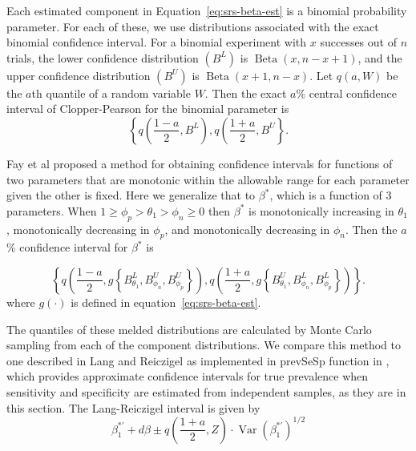 \documentclass[AMA,STIX1COL]{WileyNJD-v2}
\DeclareMathOperator{\Var}{Var}
\begin{document}
Each estimated component in Equation~\ref{eq:srs-beta-est} is a binomial probability parameter.
For each of these, we use distributions associated with  the exact binomial confidence interval.
For a binomial experiment with \( x \) successes out of \( n \) trials, the lower confidence distribution \( (B^L) \) is \( \operatorname{Beta}(x, n - x + 1) \), and the upper confidence distribution \( (B^U) \) is \( \operatorname{Beta}(x + 1, n - x)\).
Let \( q(a, W) \) be the \( a \)th quantile of a random variable \( W \). Then the exact \( a \)\% central confidence interval of Clopper-Pearson for the binomial parameter is 
\begin{equation}
\left\{ q \left( \frac{1-a}{2}, B^L \right), q \left( \frac{1+a}{2}, B^U \right\}.
\label{eq:C-P}
\end{equation}

Fay et al \cite{FayP:2015} proposed a method for obtaining confidence intervals for functions of two parameters that are monotonic within the allowable range  for each parameter given the other is fixed. Here we generalize that to $\beta^*$, which is a function of 3 parameters. When $1 \geq \phi_p > \theta_1 > \phi_n \geq 0$ then $\beta^*$ is monotonically increasing in $\theta_1$, monotonically decreasing in $\phi_p$, and monotonically decreasing in $\phi_n$.
Then the \( a \)\% confidence interval for \( \beta^* \) is 

\begin{equation}
    \left\{ q \left( \frac{1 - a}{2}, g \left\{ B_{\theta_1}^L, B_{\phi_n}^U, B_{\phi_p}^U \right\}   \right),  
            q \left( \frac{1 + a}{2},  g \left\{ B_{\theta_1}^U, B_{\phi_n}^L, B_{\phi_p}^L \right\}   \right) \right\}.
\label{eq:srs-conf-int}
\end{equation}
where $g(\cdot)$ is defined in equation~\ref{eq:srs-beta-est}.


The quantiles of these melded distributions are calculated by Monte Carlo sampling from each of the component distributions.
We compare this method to one described in Lang and Reiczigel \cite{Lang:2014} as implemented in prevSeSp function in \cite{asht}, which provides approximate confidence intervals for true prevalence when sensitivity and specificity are estimated from independent samples, as they are  in this section.
The Lang-Reiczigel interval is given by
\begin{equation}
\beta_1^{*\prime} + d\beta \pm q\left( \frac{1 + a}{2}, Z \right) \cdot \Var(\beta_1^{*\prime})^{1/2}    
\end{equation}
\end{document}
